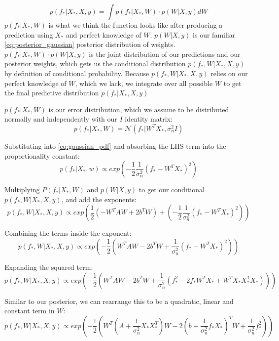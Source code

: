 \begin{equation*}
    p(f_*|X_*,X,y) = \int p(f_*|X_*,W) \cdot p(W | X,y)dW
\end{equation*}
$p(f_*|X_*,W)$ is what we think the function looks like after producing a prediction using $X_*$ and perfect knowledge of $W$. $p(W|X,y)$ is our familiar \ref{eq:posterior_gaussian} posterior distribution of weights. $p(f_*|X_*,W) \cdot p(W|X,y)$ is the joint distribution of our predictions and our posterior weights, which gets us the conditional distribution $p(f_*,W|X_*,X,y)$ by definition of conditional probability. Because $p(f_*,W|X_*,X,y)$ relies on our perfect knowledge of $W$, which we lack, we integrate over all possible $W$ to get the final predictive distribution $p(f_*|X_*,X,y)$
    
$p(f_*|X_*,W)$ is our error distribution, which we assume to be distributed normally and independently with our $I$ identity matrix:
\begin{equation*}
    p(f_* | X_*, W) = \mathcal{N}(f_* | W^TX_*, \sigma^2_nI)
\end{equation*}

Substituting into \ref{eq:gaussian_pdf} and absorbing the LHS term into the proportionality constant:
\begin{equation*}
    p(f_*|X_*,w) \propto exp\left(-\frac{1}{2}\frac{1}{\sigma^2_n}(f_* - W^TX_*)^2\right)
\end{equation*}

Multiplying $P(f_*|X_*,W)$ and $p(W|X,y)$ to get our conditional $p(f_*, W|X_*,X,y)$, and add the exponents: 
\begin{equation*}
    p(f_*,W|X_*,X,y) \propto exp\left(\frac{1}{2}(-W^TAW + 2b^TW) + \left(-\frac{1}{2}\frac{1}{\sigma^2_n}(f_* - W^TX_*)^2\right)\right)
\end{equation*}

Combining the terms inside the exponent:
\begin{equation*}
    p(f_*,W|X_*,X,y) \propto exp\left(-\frac{1}{2}\left(W^TAW - 2b^TW + \frac{1}{\sigma^2_n}(f_* - W^TX_*)^2\right)\right)
\end{equation*}

Expanding the squared term:
\begin{equation*}
    p(f_*,W|X_*,X,y) \propto exp\left(-\frac{1}{2}\left(W^TAW - 2b^TW + \frac{1}{\sigma^2_n}(f_*^2 - 2f_*W^TX_* + W^TX_*X_*^TX_*)\right)\right)
\end{equation*}

Similar to our posterior, we can rearrange this to be a quadratic, linear and constant term in $W$:
\begin{equation} \label{eq:predictive_completing_square}
    p(f_*,W|X_*,X,y) \propto exp\left(-\frac{1}{2}\left(W^T\left(A + \frac{1}{\sigma^2_n}X_*X_*^T\right)W - 2\left(b + \frac{1}{\sigma^2_n}f_*X_*\right)^TW + \frac{1}{\sigma_n^2}f_*^2\right)\right)
\end{equation}

